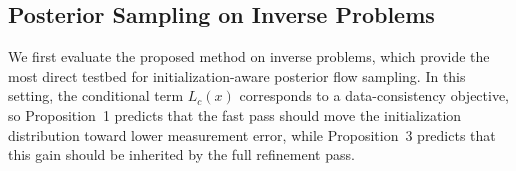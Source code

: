 \documentclass[letterpaper]{article} %
\begin{document}
\subsection{Posterior Sampling on Inverse Problems}

We first evaluate the proposed method on inverse problems, which provide the most direct testbed for initialization-aware posterior flow sampling. In this setting, the conditional term $L_c(x)$ corresponds to a data-consistency objective, so Proposition~1 predicts that the fast pass should move the initialization distribution toward lower measurement error, while Proposition~3 predicts that this gain should be inherited by the full refinement pass.

\begin{table}[t]
\centering
\caption{Quantitative comparison on DIV2K 0.8k ($768\times768$) under four inverse-problem settings \citep{Agustsson_2017_CVPR_Workshops,Timofte_2017_CVPR_Workshops}.}
\label{tab:inverse-main}
\end{table}
\end{document}
